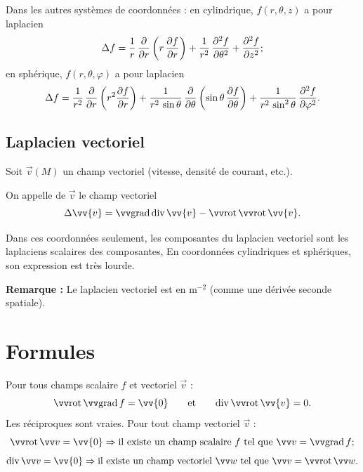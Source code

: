  Dans les autres systèmes de coordonnées : en cylindrique, $f(r,\theta,z)$ a pour laplacien
$$ \Delta f = \frac{1}{r}\, \frac{\partial}{\partial r}\left( r\, \frac{\partial f}{\partial r}\right) + \frac{1}{r^2}\, \frac{\partial^2 f}{\partial \theta^2} + \frac{\partial^2 f}{\partial z^2};$$
en sphérique, $f(r,\theta,\varphi)$ a pour laplacien
$$ \Delta f = \frac{1}{r^2}\, \frac{\partial}{\partial r}\left( r^2 \frac{\partial{f}}{\partial{r}}\right) + \frac{1}{r^2\, \sin \theta}\, \frac{\partial}{\partial \theta} \left(\sin \theta\, \frac{\partial f}{\partial \theta}\right) + \frac{1}{r^2\, \sin^2 \theta}\, \frac{\partial^2 f}{\partial \varphi^2}.$$

\subsection{Laplacien vectoriel}

Soit $\Vec{v}(M)$ un champ vectoriel (vitesse, densité de courant, etc.).
\begin{definition}
On appelle  de $\Vec{v}$ le champ vectoriel
$$
\Delta \vv{v} = \grad{}\dive{\vv{v}} - \rot{\rot{\vv{v}}} .
$$
\end{definition}


 Dans ces coordonnées seulement, les composantes du laplacien vectoriel sont les laplaciens scalaires des composantes,
En coordonnées cylindriques et sphériques, son expression est très lourde.

\noindent \textbf{Remarque :} Le laplacien vectoriel est en m$^{-2}$ (comme une dérivée seconde spatiale).


\section{Formules}

Pour tous champs scalaire $f$ et vectoriel $\Vec{v}$ :
$$\rot \grad f = \vv{0} \qquad \text{et} \qquad \dive \rot \vv{v} = 0. $$
Les réciproques sont vraies. Pour tout champ vectoriel $\Vec{v}$ :
$$\rot \Vec{v} = \vv{0} \Rightarrow  \text{il existe un champ scalaire }f\text{ tel que } \Vec{v} = \grad f ; $$
$$\dive \Vec{v} = \vv{0} \Rightarrow  \text{il existe un champ vectoriel }\Vec{w}\text{ tel que } \Vec{v} = \rot \Vec{w}. $$

